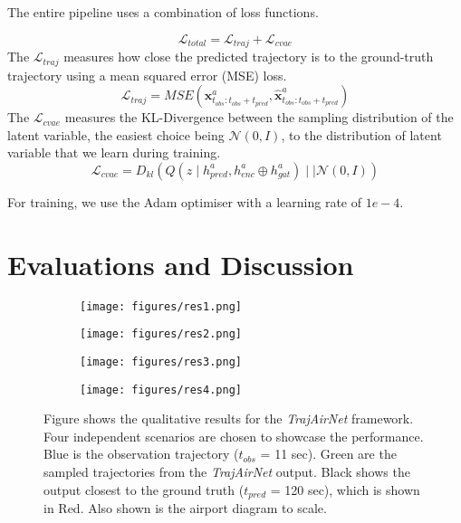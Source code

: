 \documentclass[letterpaper, 10 pt, conference]{ieeeconf}
\begin{document}
The entire pipeline uses a combination of loss functions. 

\begin{equation}
    \mathcal{L}_{total} = \mathcal{L}_{traj} + \mathcal{L}_{cvae}
\end{equation}
The $\mathcal{L}_{traj}$ measures how close the predicted trajectory is to the ground-truth trajectory using a mean squared error (MSE) loss.
\begin{equation}
    \mathcal{L}_{traj} = MSE(\mathbf{x}^{a}_{t_{obs}:t_{obs}+t_{pred}},\mathbf{\hat{x}}^{a}_{t_{obs}:t_{obs}+t_{pred}})
\end{equation}
The $\mathcal{L}_{cvae}$ measures the KL-Divergence between the sampling distribution of the latent variable, the easiest choice being $\mathcal{N}(0,I)$, to the distribution of latent variable that we learn during training.
\begin{equation}
    \mathcal{L}_{cvae} = D_{kl}(Q(z \mid h_{pred}^a, h_{enc}^a \oplus h_{gat}^a)\mid\mid \mathcal{N}(0,I))
\end{equation}

For training, we use the Adam optimiser with a learning rate of $1e-4$.


\section{Evaluations and Discussion}\label{sec:eval}
\begin{figure*}[h!]
     \centering
     \begin{subfigure}[b]{0.24\textwidth}
         \centering
    \texttt{[image: figures/res1.png]}
    \caption{}
         \label{fig:result_a}
     \end{subfigure}
     \begin{subfigure}[b]{0.24\textwidth}
         \centering
        \texttt{[image: figures/res2.png]}
            \caption{}
         \label{fig:result_b}
     \end{subfigure}
     \begin{subfigure}[b]{0.24\textwidth}
         \centering
    \texttt{[image: figures/res3.png]}
        \caption{}
         \label{fig:result_c}
     \end{subfigure}
     \begin{subfigure}[b]{0.24\textwidth}
         \centering
    \texttt{[image: figures/res4.png]}
        \caption{}
         \label{fig:result_d}
     \end{subfigure}
\caption{Figure shows the qualitative results for the \textit{TrajAirNet} framework. Four independent scenarios are chosen to showcase the performance. Blue is the observation trajectory ($t_{obs}$ = 11 sec). Green are the sampled trajectories from the \textit{TrajAirNet} output. Black shows the output closest to the ground truth ($t_{pred}$ = 120 sec), which is shown in Red. Also shown is the airport diagram to scale.}
    \label{fig:four_results}        
\end{figure*}
\end{document}

